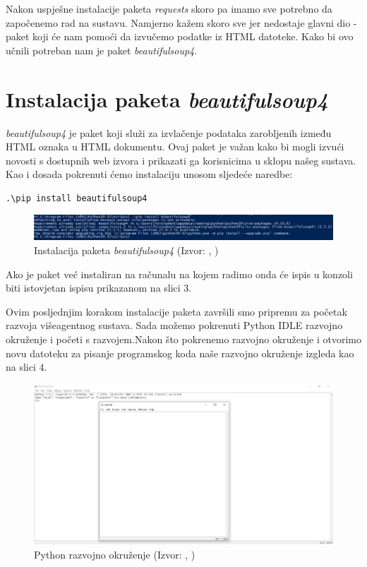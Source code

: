 \documentclass[]{foi} %
\begin{document}
Nakon uspješne instalacije paketa \textit{requests} skoro pa imamo sve potrebno da započenemo rad na sustavu. Namjerno kažem skoro sve jer nedostaje glavni dio - paket koji će nam pomoći da izvučemo podatke iz HTML datoteke. Kako bi ovo učnili potreban nam je paket \textit{beautifulsoup4}.

\section{Instalacija paketa \textit{beautifulsoup4}}
\textit{beautifulsoup4} je paket koji služi za izvlačenje podataka zarobljenih između HTML oznaka u HTML dokumentu. Ovaj paket je važan kako bi mogli izvući novosti s dostupnih web izvora i prikazati ga korisnicima u sklopu našeg sustava. Kao i dosada pokrenuti ćemo instalaciju unosom sljedeće naredbe:\begin{verbatim}.\pip install beautifulsoup4\end{verbatim}

\begin{figure}[h!]
    \centering
    \includegraphics[width=1.0\textwidth]{slike/beautifulsoup4-install.jpg}
    \caption{Instalacija paketa \textit{beautifulsoup4} (Izvor: \citeauthor{ispisInstalacijeBeautifulsoup4}, \citeyear{ispisInstalacijeBeautifulsoup4})}
    \label{fig:instalacijaBeautifulSoup4}
\end{figure}

Ako je paket već instaliran na računalu na kojem radimo onda će ispis u konzoli biti istovjetan ispisu prikazanom na slici 3.

Ovim posljednjim korakom instalacije paketa završili smo pripremu za početak razvoja višeagentnog sustava. Sada možemo pokrenuti Python IDLE razvojno okruženje i početi s razvojem.Nakon što pokrenemo razvojno okruženje i otvorimo novu datoteku za pisanje programskog koda naše razvojno okruženje izgleda kao na slici 4.

\begin{figure}[h!]
    \centering
    \includegraphics[width=1.0\textwidth]{slike/pythonIDLE.jpg}
    \caption{Python razvojno okruženje (Izvor: \citeauthor{idle}, \citeyear{idle})}
    \label{fig:PythonIDLE}
\end{figure}
\end{document}
